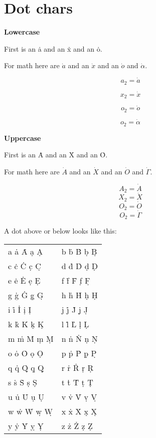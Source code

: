 \documentclass{article}
\begin{document}
\section{Dot chars}
\textbf{Lowercase}

First is an \.{a} and an \.{x} and an \.{o}.

For math here are $\dot{a}$ and an $\dot{x}$ and an $\dot{o}$ and $\dot{\alpha}$.

$$a_2=\dot{a}$$

$$x_2=\dot{x}$$

$$o_2=\dot{o}$$

$$o_2=\dot{\alpha}$$


\textbf{Uppercase}

First is an \.{A} and an \.{X} and an \.{O}.

For math here are $\dot{A}$ and an $\dot{X}$ and an $\dot{O}$ and $\dot{\Gamma}$.

$$A_2=\dot{A}$$
$$X_2=\dot{X}$$
$$O_2=\dot{O}$$
$$O_2=\dot{\Gamma}$$

A dot above or below looks like this:\\

\begin{tabular} {p{2in} p{2in}}
a \.{a} \.{A} \d{a} \d{A} &
b \.{b} \.{B} \d{b} \d{B} \\
c \.{c} \.{C} \d{c} \d{C} &
d \.{d} \.{D} \d{d} \d{D} \\
e \.{e} \.{E} \d{e} \d{E} &
f \.{f} \.{F} \d{f} \d{F} \\
g \.{g} \.{G} \d{g} \d{G} &
h \.{h} \.{H} \d{h} \d{H} \\
i \.{i} \.{I} \d{i} \d{I} &
j \.{j} \.{J} \d{j} \d{J} \\
k \.{k} \.{K} \d{k} \d{K} &
l \.{l} \.{L} \d{l} \d{L} \\
m \.{m} \.{M} \d{m} \d{M} &
n \.{n} \.{N} \d{n} \d{N} \\
o \.{o} \.{O} \d{o} \d{O} &
p \.{p} \.{P} \d{p} \d{P} \\
q \.{q} \.{Q} \d{q} \d{Q} &
r \.{r} \.{R} \d{r} \d{R} \\
s \.{s} \.{S} \d{s} \d{S} &
t \.{t} \.{T} \d{t} \d{T} \\
u \.{u} \.{U} \d{u} \d{U} &
v \.{v} \.{V} \d{v} \d{V} \\
w \.{w} \.{W} \d{w} \d{W} &
x \.{x} \.{X} \d{x} \d{X} \\
y \.{y} \.{Y} \d{y} \d{Y} &
z \.{z} \.{Z} \d{z} \d{Z} 
\end{tabular}

\end{document}
